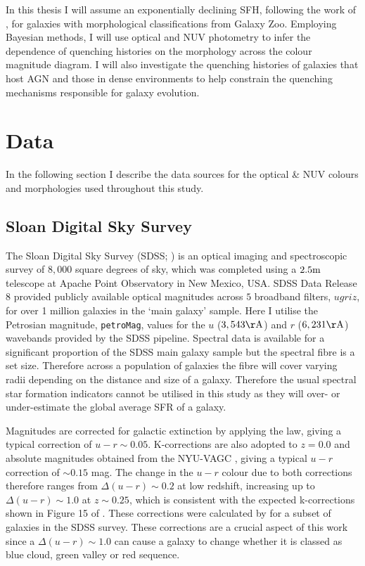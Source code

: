 In this thesis I will assume an exponentially declining SFH, following the work of \cite{schawinski14}, for galaxies with morphological classifications from Galaxy Zoo. Employing Bayesian methods, I will use optical and NUV photometry to infer the dependence of quenching histories on the morphology across the colour magnitude diagram. I will also investigate the quenching histories of galaxies that host AGN and those in dense environments to help constrain the quenching mechanisms responsible for galaxy evolution.

\section{Data}\label{sec:data}

In the following section I describe the data sources for the optical \& NUV colours and morphologies used throughout this study.

\subsection{Sloan Digital Sky Survey}\label{sec:sdssintro}

The Sloan Digital Sky Survey (SDSS; \citealt{york00}) is an optical imaging and spectroscopic survey of $8,000$ square degrees of sky, which was completed using a $2.5 \rm{m}$ telescope at Apache Point Observatory in New Mexico, USA. SDSS Data Release 8 \citep{aihara11} provided publicly available optical magnitudes across $5$ broadband filters, $ugriz$, for over 1 million galaxies in the `main galaxy' sample. Here I utilise the Petrosian magnitude, {\tt petroMag}, values for the $u$ ($3,543 \rm{\AA}$) and $r$ ($6,231 \rm{\AA}$) wavebands provided by the SDSS pipeline. Spectral data is available for a significant proportion of the SDSS main galaxy sample but the spectral fibre is a set size. Therefore across a population of galaxies the fibre will cover varying radii depending on the distance and size of a galaxy. Therefore the usual spectral star formation indicators cannot be utilised in this study as they will over- or under-estimate the global average SFR of a galaxy. 

Magnitudes are corrected for galactic extinction \citep{Oh11} by applying the \citet{Cardelli89} law, giving a typical correction of $u-r \sim 0.05$. K-corrections are also adopted to $z=0.0$ and absolute magnitudes obtained from the NYU-VAGC \citep{Blanton05, padmanabhan08, blanton07}, giving a typical $u-r$ correction of $\sim 0.15$ mag. The change in the $u-r$ colour due to both corrections therefore ranges from $\Delta (u-r) \sim 0.2$ at low redshift, increasing up to $\Delta (u-r) \sim 1.0$ at $z \sim 0.25$, which is consistent with the expected k-corrections shown in Figure 15 of \citet{blanton07}. These corrections were calculated by \citet{Bamford09} for a subset of galaxies in the SDSS survey. These corrections are a crucial aspect of this work since a $\Delta (u-r) \sim 1.0$ can cause a galaxy to change whether it is classed as blue cloud, green valley or red sequence.

